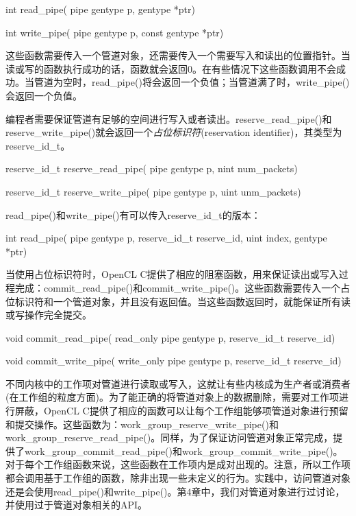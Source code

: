 \begin{codebox}[cpp]
int
read_pipe(
  pipe gentype p,
  gentype *ptr)

int
write_pipe(
  pipe gentype p,
  const gentype *ptr)
\end{codebox}

这些函数需要传入一个管道对象，还需要传入一个需要写入和读出的位置指针。当读或写的函数执行成功的话，函数就会返回0。在有些情况下这些函数调用不会成功。当管道为空时，read\_\allowbreak{}pipe()将会返回一个负值；当管道满了时，write\_\allowbreak{}pipe()会返回一个负值。

编程者需要保证管道有足够的空间进行写入或者读出。reserve\_\allowbreak{}read\_\allowbreak{}pipe()和reserve\_\allowbreak{}write\_\allowbreak{}pipe()就会返回一个\emph{占位标识符}(reservation identifier)，其类型为reserve\_\allowbreak{}id\_\allowbreak{}t。

\begin{codebox}[cpp]
reserve_id_t
reserve_read_pipe(
  pipe gentype p,
  nint num_packets)

reserve_id_t
reserve_write_pipe(
  pipe gentype p,
  uint unm_packets)
\end{codebox}

read\_\allowbreak{}pipe()和write\_\allowbreak{}pipe()有可以传入reserve\_\allowbreak{}id\_\allowbreak{}t的版本：

\begin{codebox}[cpp]
int
read_pipe(
  pipe gentype p,
  reserve_id_t reserve_id,
  uint index,
  gentype *ptr)
\end{codebox}

当使用占位标识符时，OpenCL C提供了相应的阻塞函数，用来保证读出或写入过程完成：commit\_\allowbreak{}read\_\allowbreak{}pipe()和commit\_\allowbreak{}write\_\allowbreak{}pipe()。这些函数需要传入一个占位标识符和一个管道对象，并且没有返回值。当这些函数返回时，就能保证所有读或写操作完全提交。

\begin{codebox}[cpp]
void
commit_read_pipe(
  read_only pipe gentype p,
  reserve_id_t reserve_id)

void
commit_write_pipe(
  write_only pipe gentype p,
  reserve_id_t reserve_id)
\end{codebox}

不同内核中的工作项对管道进行读取或写入，这就让有些内核成为生产者或消费者(在工作组的粒度方面)。为了能正确的将管道对象上的数据删除，需要对工作项进行屏蔽，OpenCL C提供了相应的函数可以让每个工作组能够项管道对象进行预留和提交操作。这些函数为：work\_\allowbreak{}group\_\allowbreak{}reserve\_\allowbreak{}write\_\allowbreak{}pipe()和work\_\allowbreak{}group\_\allowbreak{}reserve\_\allowbreak{}read\_\allowbreak{}pipe()。同样，为了保证访问管道对象正常完成，提供了work\_\allowbreak{}group\_\allowbreak{}commit\_\allowbreak{}read\_\allowbreak{}pipe()和work\_\allowbreak{}group\_\allowbreak{}commit\_\allowbreak{}write\_\allowbreak{}pipe()。对于每个工作组函数来说，这些函数在工作项内是成对出现的。注意，所以工作项都会调用基于工作组的函数，除非出现一些未定义的行为。实践中，访问管道对象还是会使用read\_\allowbreak{}pipe()和write\_\allowbreak{}pipe()。第4章中，我们对管道对象进行过讨论，并使用过于管道对象相关的API。

